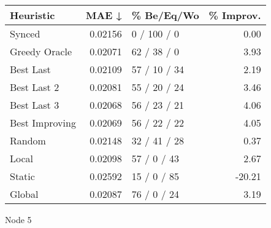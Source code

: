 \begin{tabular}{lrlr}
\toprule
\textbf{Heuristic} & \textbf{MAE ↓} & \textbf{\% Be/Eq/Wo} & \textbf{\% Improv.} \\
\midrule
            Synced &        0.02156 &          0 / 100 / 0 &                0.00 \\
     Greedy Oracle &        0.02071 &          62 / 38 / 0 &                3.93 \\
         Best Last &        0.02109 &         57 / 10 / 34 &                2.19 \\
       Best Last 2 &        0.02081 &         55 / 20 / 24 &                3.46 \\
       Best Last 3 &        0.02068 &         56 / 23 / 21 &                4.06 \\
    Best Improving &        0.02069 &         56 / 22 / 22 &                4.05 \\
            Random &        0.02148 &         32 / 41 / 28 &                0.37 \\
             Local &        0.02098 &          57 / 0 / 43 &                2.67 \\
            Static &        0.02592 &          15 / 0 / 85 &              -20.21 \\
            Global &        0.02087 &          76 / 0 / 24 &                3.19 \\
\bottomrule
\end{tabular}
\caption{Node 5}
\label{tab:iid_lr01_le2_bs4_5}
